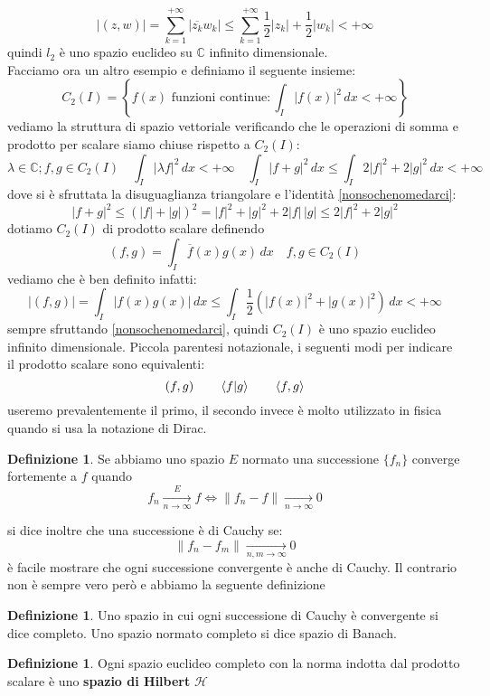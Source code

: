 \documentclass[12pt]{book}
\theoremstyle{plain}
\newcommand{\C}{\mathbb{C}}
\renewcommand{\H}{\mathcal{H}}
\theoremstyle{definition}
\newtheorem{dfn}[thm]{Definizione}
\theoremstyle{remark}
\begin{document}
\[|(z,w)| = \sum_{k=1}^{+\infty}| \overline{z_k}{w_k}| \leq \sum_{k=1}^{+\infty}\frac{1}{2}|z_k| + \frac{1}{2}|w_k| <+\infty\]
quindi $l_2$ è uno spazio euclideo su $\C$ infinito dimensionale.\\Facciamo ora un altro esempio e definiamo il seguente insieme:
\[C_2(I) = \left\{f(x)\,\, \text{funzioni continue}: \int_I |f(x)|^2\,dx<+\infty\right\}\]
vediamo la struttura di spazio vettoriale verificando che le operazioni di somma e prodotto per scalare siamo chiuse rispetto a $C_2(I)$:
\[\lambda \in\C;f,g\in C_2(I) \quad \int_I|\lambda f|^2\,dx <+\infty \quad \int_I |f+g|^2\,dx \leq   \int_I 2|f|^2+2|g|^2\,dx <+\infty\]
dove si è sfruttata la disuguaglianza triangolare e l'identità \eqref{nonsochenomedarci}:
\begin{equation}
\label{disutileinseguito}
|f+g|^2 \leq (|f|+|g|)^2 = |f|^2 + |g|^2 + 2|f|\,|g| \leq 2|f|^2 + 2|g|^2
\end{equation}
dotiamo $C_2(I)$ di prodotto scalare definendo
\[(f,g) = \int_I \overline{f}(x)g(x)\,dx \quad f,g\in C_2(I) \]
vediamo che è ben definito infatti:
\[|(f,g)| = \int_I |f(x)g(x)| \,dx \leq \int_I \frac{1}{2}(|f(x)|^2+|g(x)|^2)\,dx <+\infty\]
sempre sfruttando \eqref{nonsochenomedarci}, quindi $C_2(I)$ è uno spazio euclideo infinito dimensionale. Piccola parentesi notazionale, i seguenti modi per indicare il prodotto scalare sono equivalenti:
\[(f,g)\qquad \braket{f|g}\qquad \braket{f,g}\]
useremo prevalentemente il primo, il secondo invece è molto utilizzato in fisica quando si usa la notazione di Dirac.\\
\begin{dfn}
Se abbiamo uno spazio $E$ normato una successione $\{f_n\}$ converge fortemente a $f$ quando
\[f_n \xrightarrow[n\to \infty]{E} f \iff \|f_n-f\| \xrightarrow[n\to \infty]{} 0 \]
\end{dfn}
\hspace{-1.6em}si dice inoltre che una successione è di Cauchy se:
\[\|f_n - f_m\| \xrightarrow[n,m\to \infty]{}0 \]
è facile mostrare che ogni successione convergente è anche di Cauchy. Il contrario non è sempre vero però e abbiamo la seguente definizione
\begin{dfn}
Uno spazio in cui ogni successione di Cauchy è convergente si dice completo. Uno spazio normato completo si dice spazio di Banach.
\end{dfn}
\begin{dfn}
Ogni spazio euclideo completo con la norma indotta dal prodotto scalare è uno \textbf{spazio di Hilbert} $\H$
\end{dfn}
\end{document}
